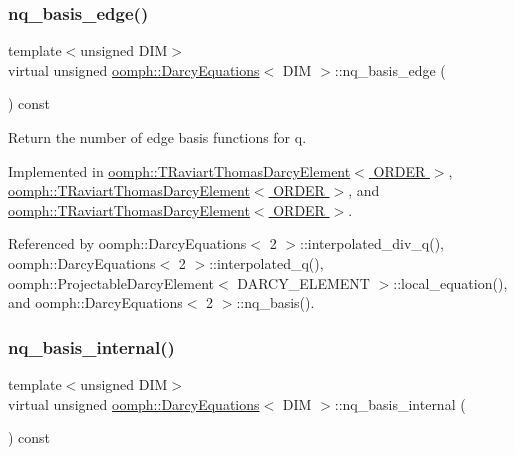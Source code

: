 \subsubsection{\texorpdfstring{nq\+\_\+basis\+\_\+edge()}{nq\_basis\_edge()}}
{\footnotesize\ttfamily template$<$unsigned D\+IM$>$ \\
virtual unsigned \hyperlink{classoomph_1_1DarcyEquations}{oomph\+::\+Darcy\+Equations}$<$ D\+IM $>$\+::nq\+\_\+basis\+\_\+edge (\begin{DoxyParamCaption}{ }\end{DoxyParamCaption}) const\hspace{0.3cm}{\ttfamily [pure virtual]}}



Return the number of edge basis functions for q. 



Implemented in \hyperlink{classoomph_1_1TRaviartThomasDarcyElement_aeb3471d92cbe379e8c91dc6982c89e5f}{oomph\+::\+T\+Raviart\+Thomas\+Darcy\+Element$<$ O\+R\+D\+E\+R $>$}, \hyperlink{classoomph_1_1TRaviartThomasDarcyElement_af8ab0d926cdbb46da734e4db8461a2e5}{oomph\+::\+T\+Raviart\+Thomas\+Darcy\+Element$<$ O\+R\+D\+E\+R $>$}, and \hyperlink{classoomph_1_1TRaviartThomasDarcyElement_a9b4ab72d9ab1142f3f68737935bc0075}{oomph\+::\+T\+Raviart\+Thomas\+Darcy\+Element$<$ O\+R\+D\+E\+R $>$}.



Referenced by oomph\+::\+Darcy\+Equations$<$ 2 $>$\+::interpolated\+\_\+div\+\_\+q(), oomph\+::\+Darcy\+Equations$<$ 2 $>$\+::interpolated\+\_\+q(), oomph\+::\+Projectable\+Darcy\+Element$<$ D\+A\+R\+C\+Y\+\_\+\+E\+L\+E\+M\+E\+N\+T $>$\+::local\+\_\+equation(), and oomph\+::\+Darcy\+Equations$<$ 2 $>$\+::nq\+\_\+basis().

\mbox{\label{classoomph_1_1DarcyEquations_ad1836d0919835cd1d5f6af654ca03a52}} 
\subsubsection{\texorpdfstring{nq\+\_\+basis\+\_\+internal()}{nq\_basis\_internal()}}
{\footnotesize\ttfamily template$<$unsigned D\+IM$>$ \\
virtual unsigned \hyperlink{classoomph_1_1DarcyEquations}{oomph\+::\+Darcy\+Equations}$<$ D\+IM $>$\+::nq\+\_\+basis\+\_\+internal (\begin{DoxyParamCaption}{ }\end{DoxyParamCaption}) const\hspace{0.3cm}{\ttfamily [pure virtual]}}



